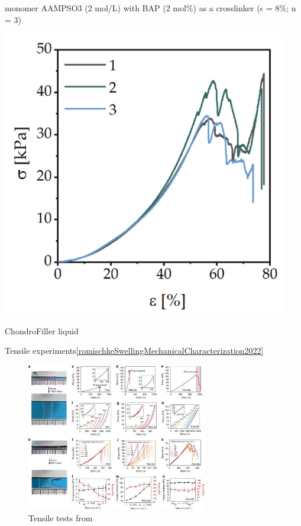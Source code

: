 \begin{minipage}[c]{\textwidth}
\begin{minipage}[c]{0.45\textwidth}
     monomer AAMPSO3 (2 mol/L) with BAP (2 mol\%) as a crosslinker ($\epsilon$ = 8\%; n = 3)
\end{minipage}

\begin{minipage}[c]{0.45\textwidth}
    \includegraphics[width=\textwidth]{figs/mechResponse/2c.png}

    ChondroFiller liquid
\end{minipage}

Tensile experiments\ref{romischkeSwellingMechanicalCharacterization2022}

\end{minipage}

\begin{figure}[ht!]
    \centering
    \includegraphics[width=0.7\textwidth]{figs/mechResponse/3.jpeg}
    \caption{Tensile tests from\citep{leiStretchableHydrogelsLow2020a}}
\end{figure}

